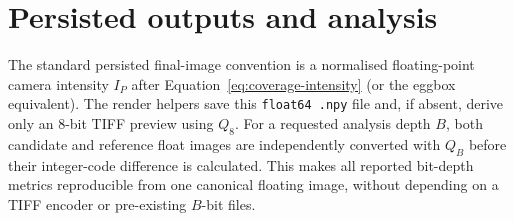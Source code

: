\documentclass[11pt,a4paper]{article}
\begin{document}
\section{Persisted outputs and analysis}

The standard persisted final-image convention is a normalised floating-point
camera intensity $I_P$ after Equation~\eqref{eq:coverage-intensity} (or the
eggbox equivalent).  The render helpers save this \texttt{float64 .npy} file
and, if absent, derive only an 8-bit TIFF preview using $Q_8$.  For a requested
analysis depth $B$, both candidate and reference float images are independently
converted with $Q_B$ before their integer-code difference is calculated.  This
makes all reported bit-depth metrics reproducible from one canonical floating
image, without depending on a TIFF encoder or pre-existing $B$-bit files.
\end{document}

